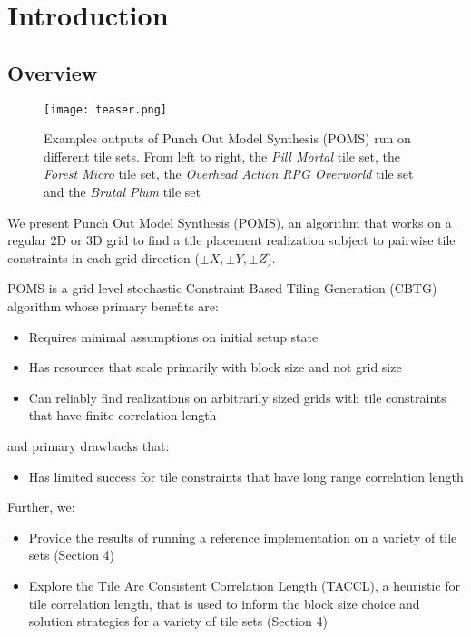 \section{Introduction}

\subsection{Overview}

\begin{figure*}[ht]
  \texttt{[image: teaser.png]}
  \caption{Examples outputs of Punch Out Model Synthesis (POMS) run on different tile sets. From left to right, the \textit{Pill Mortal} tile set, the \textit{Forest Micro} tile set, the \textit{Overhead Action RPG Overworld} tile set and the \textit{Brutal Plum} tile set}
  \label{fig:teaser}
\end{figure*}

We present Punch Out Model Synthesis (POMS), an algorithm that works on a regular 2D or 3D
grid to find a tile placement realization subject to pairwise tile constraints in each grid direction
($\pm X, \pm Y, \pm Z$).

POMS is a grid level stochastic Constraint Based Tiling Generation (CBTG) algorithm whose primary benefits are:

\begin{itemize}
  \item Requires minimal assumptions on initial setup state
  \item Has resources that scale primarily with block size and not grid size
  \item Can reliably find realizations on arbitrarily sized grids with tile constraints that have finite correlation length
\end{itemize}

and primary drawbacks that:

\begin{itemize}
  \item Has limited success for tile constraints that have long range correlation length
\end{itemize}

Further, we:

\begin{itemize}
  \item Provide the results of running a reference implementation on a variety of tile sets (Section 4)
  \item Explore the Tile Arc Consistent Correlation Length (TACCL), a heuristic for tile correlation length,
        that is used to inform the block size choice and solution strategies for a variety of tile sets (Section 4)
\end{itemize}

